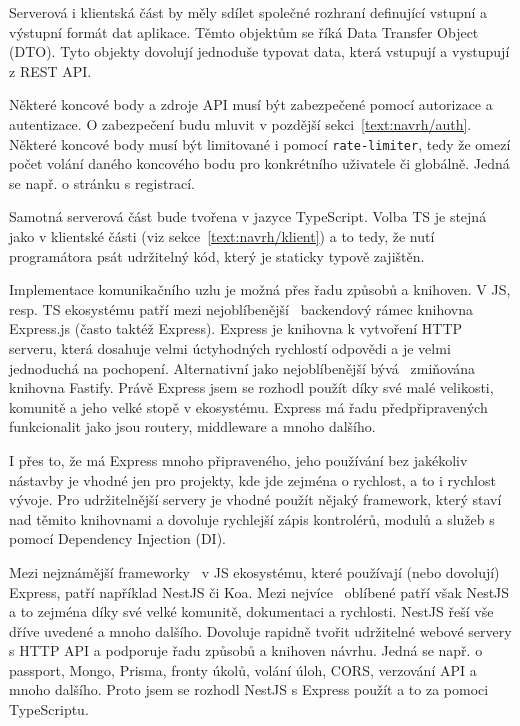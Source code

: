 Serverová i klientská část by měly sdílet společné rozhraní definující vstupní a výstupní formát dat aplikace.
Těmto objektům se říká Data Transfer Object (DTO).
Tyto objekty dovolují jednoduše typovat data, která vstupují a vystupují z REST API.

Některé koncové body a zdroje API musí být zabezpečené pomocí autorizace a autentizace. 
O zabezpečení budu mluvit v pozdější sekci~\ref{text:navrh/auth}.
Některé koncové body musí být limitované i pomocí \verb|rate-limiter|, tedy že omezí počet volání daného koncového bodu pro konkrétního uživatele či globálně.
Jedná se např. o stránku s registrací.

Samotná serverová část bude tvořena v jazyce TypeScript.
Volba TS je stejná jako v klientské části (viz sekce~\ref{text:navrh/klient}) a to tedy, že nutí programátora psát udržitelný kód, který je staticky typově zajištěn.

Implementace komunikačního uzlu je možná přes řadu způsobů a knihoven.
V JS, resp. TS ekosystému patří mezi nejoblíbenější~\cite{brown2019web} backendový rámec knihovna Express.js (často taktéž Express).
Express je knihovna k vytvoření HTTP serveru, která dosahuje velmi úctyhodných rychlostí odpovědi a je velmi jednoduchá na pochopení.
Alternativní jako nejoblíbenější bývá~\cite{poreba_2023} zmiňována knihovna Fastify.
Právě Express jsem se rozhodl použít díky své malé velikosti, komunitě a jeho velké stopě v ekosystému.
Express má řadu předpřipravených funkcionalit jako jsou routery, middleware a mnoho dalšího.

I přes to, že má Express mnoho připraveného, jeho používání bez jakékoliv nástavby je vhodné jen pro projekty, kde jde zejména o rychlost, a to i rychlost vývoje.
Pro udržitelnější servery je vhodné použít nějaký framework, který staví nad těmito knihovnami a dovoluje rychlejší zápis kontrolérů, modulů a služeb s pomocí Dependency Injection (DI).

Mezi nejznámější frameworky~\cite{uzayr2022frontend, nest} v JS ekosystému, které používají (nebo dovolují) Express, patří například NestJS či Koa.
Mezi nejvíce~\cite{nest} oblíbené patří však NestJS a to zejména díky své velké komunitě, dokumentaci a rychlosti.
NestJS řeší vše dříve uvedené a mnoho dalšího.
Dovoluje rapidně tvořit udržitelné webové servery s HTTP API a podporuje řadu způsobů a knihoven návrhu.
Jedná se např. o passport, Mongo, Prisma, fronty úkolů, volání úloh, CORS, verzování API a mnoho dalšího.
Proto jsem se rozhodl NestJS s Express použít a to za pomoci TypeScriptu.

